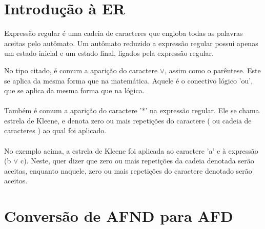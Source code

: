 \documentclass[a4paper,10pt]{article} %
\begin{document}
\section{Introdução à ER}

    Expressão regular é uma cadeia de caracteres que engloba todas as palavras aceitas pelo autômato. Um autômato reduzido a expressão regular possui apenas um estado inicial e um estado final, ligados pela expressão regular.
\begin{center}
\end{center}


    No tipo citado, é comum a aparição do caractere {$\lor$}, assim como o parêntese. Este se aplica da mesma forma que na matemática. Aquele é o conectivo lógico 'ou', que se aplica da mesma forma que na lógica.\\\\Também é comum a aparição do caractere '*' na expressão regular. Ele se chama estrela de Kleene, e denota zero ou mais repetições do caractere ( ou cadeia de caracteres ) ao qual foi aplicado.\\\\No exemplo acima, a estrela de Kleene foi aplicada ao caractere 'a' e à expressão (b {$\lor$} c). Neste, quer dizer que zero ou mais repetições da cadeia denotada serão aceitas, enquanto naquele, zero ou mais repetições do caractere denotado serão aceitos.


\section{Conversão de AFND para AFD}
\end{document}
